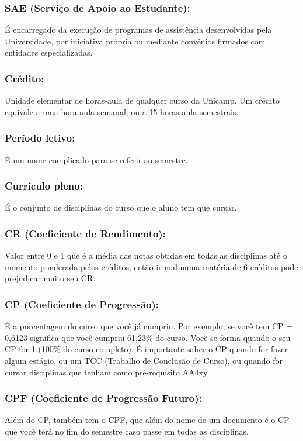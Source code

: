 \subsubsection{SAE (Serviço de Apoio ao Estudante):} É encarregado da execução
de programas de assistência desenvolvidas pela Universidade, por iniciativa
própria ou mediante convênios firmados com entidades especializadas.

\subsubsection{Crédito:} Unidade elementar de horas-aula de qualquer curso da
Unicamp. Um crédito equivale a uma hora-aula semanal, ou a 15 horas-aula
semestrais.

\subsubsection{Período letivo:} É um nome complicado para se referir ao
semestre.

\subsubsection{Currículo pleno:} É o conjunto de disciplinas do curso que o
aluno tem que cursar.

\subsubsection{CR (Coeficiente de Rendimento):} Valor entre 0 e 1 que é a média
das notas obtidas em todas as disciplinas até o momento ponderada pelos
créditos, então ir mal numa matéria de 6 créditos pode prejudicar muito seu CR.

\subsubsection{CP (Coeficiente de Progressão):} É a porcentagem do curso que
você já cumpriu. Por exemplo, se você tem CP = 0,6123 significa que você
cumpriu 61,23\% do curso. Você se forma quando o seu CP for 1 (100\% do curso
completo). É importante saber o CP quando for fazer algum estágio, ou um TCC
(Trabalho de Conclusão de Curso), ou quando for cursar disciplinas que tenham
como pré-requisito AA4xy.

\subsubsection{CPF (Coeficiente de Progressão Futuro):} Além do CP, também tem
o CPF, que além do nome de um documento é o CP que você terá no fim do semestre
caso passe em todas as disciplinas.

